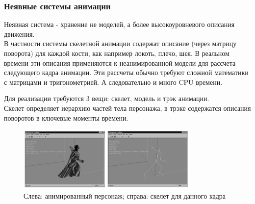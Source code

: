 \documentclass{beamer}
\begin{document}
  
\begin{frame}
\frametitle{Неявные системы анимации}
\begin{scriptsize}
    Неявная система - хранение не моделей, а более высокоуровневого описания движения. \\
    В частности системы скелетной анимации содержат описание (через матрицу поворота) для каждой кости, как например локоть, плечо, шея. В реальном времени эти описания применяются к неанимированной модели для рассчета следующего кадра анимации. Эти рассчеты обычно требуют сложной математики с матрицами и тригонометрией. А следовательно и много CPU времени.
    
    \medskip
    Для реализации требуются 3 вещи: скелет, модель и трэк анимации. \\  
    Скелет определяет иерархию частей тела персонажа, в трэке содержатся описания поворотов в ключевые моменты времени.
    
\begin{figure}[h!]
    \centering
    \includegraphics[width=0.8\textwidth]{implicit_animation.png}
    \caption{\scriptsize{Слева: анимированный персонаж; справа: скелет для данного кадра}}
\end{figure}

\end{scriptsize}
\end{frame}
\end{document}
